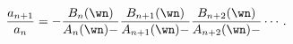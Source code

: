 \begin{equation}
{a_{n+1}\over a_{n}} = - {B_{n}(\wn)\over A_{n}(\wn)
-}{B_{n+1}(\wn)\over A_{n+1}(\wn)-}{B_{n+2}(\wn)\over A_{n+2}(\wn)
-}\cdots \,. 
\label{fractionn}
\end{equation}

